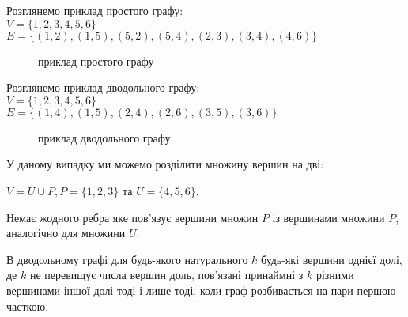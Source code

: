 \begin{example}
Розглянемо приклад простого графу: \\ $ V = \{1,2,3,4,5,6\}$ \\ $ E = \{ (1,2), (1,5), (5,2), (5,4), (2,3), (3,4), (4,6) \} $
\begin{figure}
\begin{center}
\end{center}
\caption{приклад простого графу}
\end{figure}
\end{example}

\begin{example}
Розглянемо приклад дводольного графу: \\ $ V = \{1,2,3,4,5,6\}$ \\ $ E = \{ (1,4), (1,5), (2,4), (2,6), (3,5), (3,6) \} $
\begin{figure}
\begin{center}
\end{center}
\caption{приклад дводольного графу}
\end{figure}
У даному випадку ми можемо розділити множину вершин на дві:
\begin{center}
$V = U \cup P, P = \{1,2,3\}$ та $U = \{4,5,6\}$.
\end{center}
Немає жодного ребра яке пов'язує вершини множин $P$ із вершинами множини $P$, аналогічно для множини $U$.
\end{example}

\begin{theorem}
В дводольному графі для будь-якого натурального $k$ будь-які вершини однієї долі, де $k$ не перевищує числа вершин доль, пов'язані принаймні з $k$ різними вершинами іншої долі тоді і лише тоді, коли граф розбивається на пари першою часткою.
\end{theorem}

